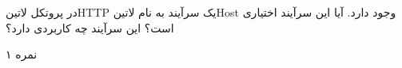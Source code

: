
در پروتکل ‌لاتین{HTTP} یک سرآیند به نام ‌لاتین{Host} وجود دارد. آیا این سرآیند اختیاری است؟ این سرآیند چه کاربردی دارد؟

۱ نمره
